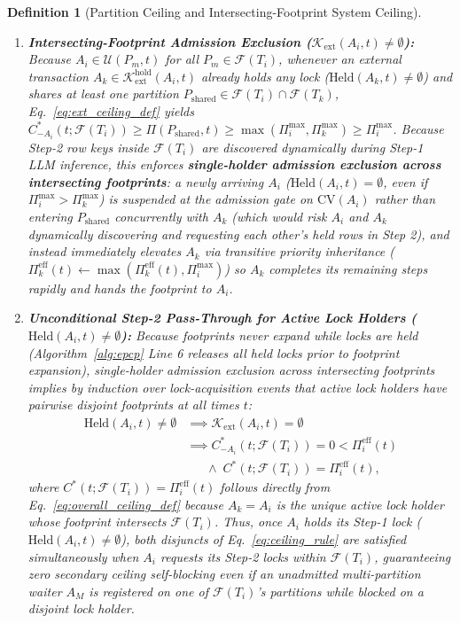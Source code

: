 \documentclass[conference,10pt]{IEEEtran}
\newtheorem{definition}{Definition}
\begin{document}
\begin{definition}[Partition Ceiling and Intersecting-Footprint System Ceiling]
\begin{enumerate}
    \item \textbf{Intersecting-Footprint Admission Exclusion ($\mathcal{K}_{\text{ext}}(A_i, t) \ne \emptyset$):} Because $A_i \in \mathcal{U}(P_m, t)$ for all $P_m \in \mathcal{F}(T_i)$, whenever an external transaction $A_k \in \mathcal{K}_{\text{ext}}^{\text{hold}}(A_i, t)$ already holds any lock ($\text{Held}(A_k, t) \ne \emptyset$) and shares at least one partition $P_{\text{shared}} \in \mathcal{F}(T_i) \cap \mathcal{F}(T_k)$, Eq.~\eqref{eq:ext_ceiling_def} yields $C_{-A_i}^*(t; \mathcal{F}(T_i)) \ge \Pi(P_{\text{shared}}, t) \ge \max(\Pi_i^{\max}, \Pi_k^{\max}) \ge \Pi_i^{\max}$. Because Step-2 row keys inside $\mathcal{F}(T_i)$ are discovered dynamically during Step-1 LLM inference, this enforces \textbf{single-holder admission exclusion across intersecting footprints}: a newly arriving $A_i$ ($\text{Held}(A_i, t) = \emptyset$, even if $\Pi_i^{\max} > \Pi_k^{\max}$) is suspended at the admission gate on $\text{CV}(A_i)$ rather than entering $P_{\text{shared}}$ concurrently with $A_k$ (which would risk $A_i$ and $A_k$ dynamically discovering and requesting each other's held rows in Step 2), and instead immediately elevates $A_k$ via transitive priority inheritance ($\Pi_k^{\text{eff}}(t) \leftarrow \max(\Pi_k^{\text{eff}}(t), \Pi_i^{\max})$) so $A_k$ completes its remaining steps rapidly and hands the footprint to $A_i$.
    \item \textbf{Unconditional Step-2 Pass-Through for Active Lock Holders ($\text{Held}(A_i, t) \ne \emptyset$):} Because footprints never expand while locks are held (Algorithm~\ref{alg:epcp} Line 6 releases all held locks prior to footprint expansion), single-holder admission exclusion across intersecting footprints implies by induction over lock-acquisition events that active lock holders have pairwise disjoint footprints at all times $t$:
    \begin{equation}
    \label{eq:disjoint_active_holders}
    \begin{aligned}
    \text{Held}(A_i, t) \ne \emptyset &\implies \mathcal{K}_{\text{ext}}(A_i, t) = \emptyset \\
    &\implies C_{-A_i}^*(t; \mathcal{F}(T_i)) = 0 < \Pi_i^{\text{eff}}(t) \\
    &\quad\;\; \land\; C^*(t; \mathcal{F}(T_i)) = \Pi_i^{\text{eff}}(t),
    \end{aligned}
    \end{equation}
    where $C^*(t; \mathcal{F}(T_i)) = \Pi_i^{\text{eff}}(t)$ follows directly from Eq.~\eqref{eq:overall_ceiling_def} because $A_k = A_i$ is the unique active lock holder whose footprint intersects $\mathcal{F}(T_i)$. Thus, once $A_i$ holds its Step-1 lock ($\text{Held}(A_i, t) \ne \emptyset$), both disjuncts of Eq.~\eqref{eq:ceiling_rule} are satisfied simultaneously when $A_i$ requests its Step-2 locks within $\mathcal{F}(T_i)$, guaranteeing zero secondary ceiling self-blocking even if an unadmitted multi-partition waiter $A_M$ is registered on one of $\mathcal{F}(T_i)$'s partitions while blocked on a disjoint lock holder.
\end{enumerate}
\end{definition}
\end{document}
